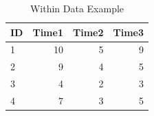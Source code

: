 \begin{table}[ht]
	\centering
	\caption{Within Data Example}
	\begin{tabular}{lrrr}
		\hline
		ID & Time1 & Time2 & Time3 \\
		\hline
		1  & 10    & 5     & 9     \\
		2  & 9     & 4     & 5     \\
		3  & 4     & 2     & 3     \\
		4  & 7     & 3     & 5     \\
		\hline
	\end{tabular}
	\label{tbl::22_05}
\end{table}
